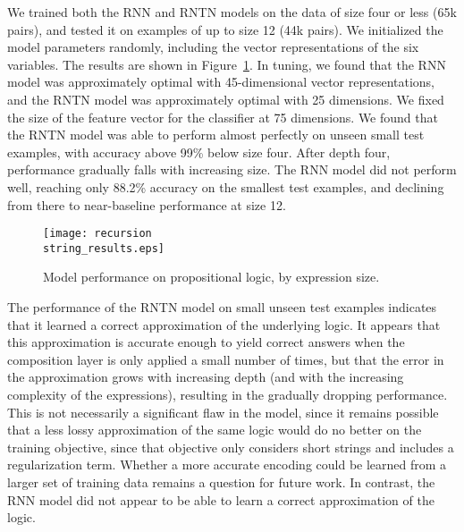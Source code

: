 We trained both the RNN and RNTN models on the data of size four or
less (65k pairs), and tested it on examples of up to size 12 (44k
pairs). We initialized the model parameters randomly, including the
vector representations of the six variables. The results are shown in
Figure~\ref{prop-results}. In tuning, we found that the RNN model was
approximately optimal with 45-dimensional vector representations, and
the RNTN model was approximately optimal with 25 dimensions. We fixed
the size of the feature vector for the classifier at 75 dimensions. We
found that the RNTN model was able to perform almost perfectly on
unseen small test examples, with accuracy above 99\% below size four.
After depth four, performance gradually falls with increasing size.
The RNN model did not perform well, reaching only 88.2\% accuracy on
the smallest test examples, and declining from there to near-baseline
performance at size 12.

\begin{figure}[htp]
  \centering
  \texttt{[image: recursion\\string\_results.eps]}
  \caption{Model performance on propositional logic, by expression size.}  
  \label{prop-results}
\end{figure}

The performance of the RNTN model on small unseen test examples
indicates that it learned a correct approximation of the underlying
logic. It appears that this approximation is accurate enough to yield
correct answers when the composition layer is only applied a small
number of times, but that the error in the approximation grows with
increasing depth (and with the increasing complexity of the expressions),
 resulting in the gradually dropping performance. This is not
necessarily a significant flaw in the model, since it remains possible
that a less lossy approximation of the same logic would do no better
on the training objective, since that objective only considers short
strings and includes a regularization term. Whether a more accurate
encoding could be learned from a larger set of training data remains a
question for future work. In contrast, the RNN model did not appear to
be able to learn a correct approximation of the logic.

